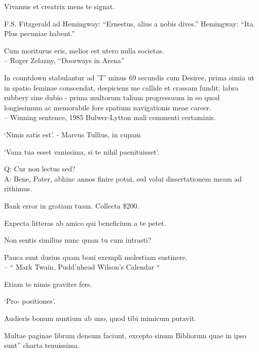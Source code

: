 \documentclass[titlepage,12pt]{memoir}
\begin{document}
Vivamus et creatrix mens te signat.

F.S. Fitzgerald ad Hemingway:
“Ernestus, alius a nobis dives.”
Hemingway:
“Ita. Plus pecuniae habent.”

Cum moriturus eris, melior est utero nulla societas.
\\-- Roger Zelazny, “Doorways in Arena”

In countdown stabulantur ad ’T’ minus 69 secundis cum Desiree, prima
simia ut in spatio feminae conscendat, despiciens me callide et crassam fundit;
labra rubbery sine dubio - prima multorum talium progressuum in eo quod
longissimum ac memorabile fore spatium navigationis meae
career.
\\-- Winning sentence, 1985 Bulwer-Lytton mali commenti certaminis.

‘Nimis satis est’.
- Marcus Tullius, in cupam

‘Vana tua esset vanissima, si te nihil paenituisset’.

Q: Cur non lectus sed?\\
A: Bene, Pater, abhinc annos finire potui, sed volui
dissertationem meam ad rithimus.

Bank error in gratiam tuam. Collecta \$200.

Expecta litteras ab amico qui beneficium a te petet.

Non sentis similius nunc quam tu cum intrasti?

 Pauca sunt durius quam boni exempli molestiam sustinere.
\\-- “ Mark Twain, Pudd’nhead Wilson’s Calendar “

Etiam te nimis graviter fers.

‘Pro- positiones’.

Audieris bonum nuntium ab uno, quod tibi inimicum putavit.

Multae paginae librum densum faciunt, excepto sinum Bibliorum quae in ipso sunt”
charta tenuissima.
\end{document}
